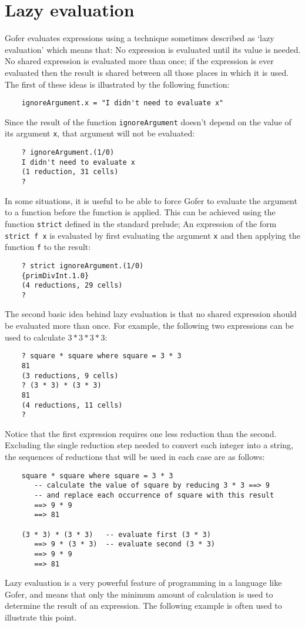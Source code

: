 \section{Lazy evaluation}
Gofer evaluates expressions using a technique  sometimes  described  as
`lazy evaluation' which means that:
\BSI
\IT  No expression is evaluated until its value is needed.
\IT  No  shared  expression  is  evaluated  more  than  once;  if   the
     expression is ever evaluated then the result is shared between all
     those places in which it is used.
\ESI
The first of these ideas is illustrated by the following function:
\begin{verbatim}
    ignoreArgument.x = "I didn't need to evaluate x"
\end{verbatim}
Since the result of the function \verb"ignoreArgument" doesn't depend on the
value of its argument \verb"x", that argument will not be evaluated:
\begin{verbatim}
    ? ignoreArgument.(1/0)
    I didn't need to evaluate x
    (1 reduction, 31 cells)
    ?
\end{verbatim}
In some situations, it is useful to be able to force Gofer to  evaluate
the argument to a function before the function is applied.  This can be
achieved using the function \verb"strict" defined in the  standard  prelude;
An expression of the form \verb"strict f x" is evaluated by first evaluating
the argument \verb"x" and then applying the function \verb"f" to the result:
\begin{verbatim}
    ? strict ignoreArgument.(1/0)
    {primDivInt.1.0}
    (4 reductions, 29 cells)
    ?
\end{verbatim}
The second  basic  idea  behind  lazy  evaluation  is  that  no  shared
expression should be  evaluated  more  than  once.   For  example,  the
following two expressions can be used to calculate $3*3*3*3$:
\begin{verbatim}
    ? square * square where square = 3 * 3
    81
    (3 reductions, 9 cells)
    ? (3 * 3) * (3 * 3)
    81
    (4 reductions, 11 cells)
    ?
\end{verbatim}
Notice that the first expression requires one less reduction  than  the
second.  Excluding the single reduction step  needed  to  convert  each
integer into a string, the sequences of reductions that will be used in
each case are as follows:
\begin{verbatim}
    square * square where square = 3 * 3
       -- calculate the value of square by reducing 3 * 3 ==> 9
       -- and replace each occurrence of square with this result
       ==> 9 * 9
       ==> 81

    (3 * 3) * (3 * 3)   -- evaluate first (3 * 3)
       ==> 9 * (3 * 3)  -- evaluate second (3 * 3)
       ==> 9 * 9
       ==> 81
\end{verbatim}
Lazy evaluation is a very powerful feature of programming in a language
like Gofer, and means that only the minimum amount  of  calculation  is
used to determine the result of an expression.  The  following  example
is often used to illustrate this point.

